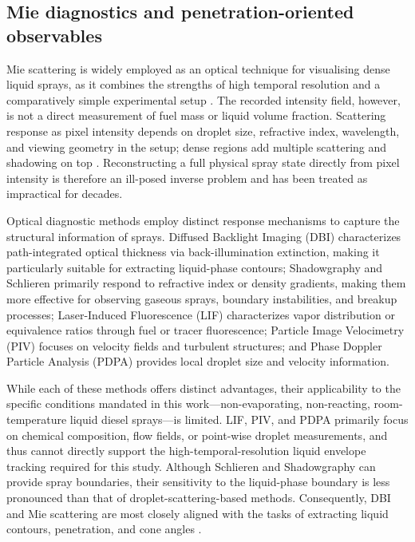 \documentclass[english, 12pt, a4paper, elec, utf8, a-2b, online]{aaltothesis}
\begin{document}
\subsection{Mie diagnostics and penetration-oriented observables}

Mie scattering is widely employed as an optical technique for visualising dense liquid sprays, 
as it combines the strengths of high temporal resolution and a comparatively simple experimental setup \cite{Linne2013SprayImaging}. 
The recorded intensity field, however, is not a direct measurement of fuel mass or liquid volume fraction. 
Scattering response as pixel intensity depends on droplet size, refractive index, wavelength, and viewing geometry in the setup; 
dense regions add multiple scattering and shadowing on top \cite{BohrenHuffman2004,Linne2013SprayImaging}. 
Reconstructing a full physical spray state directly from pixel intensity is therefore an ill-posed inverse problem 
and has been treated as impractical for decades.

Optical diagnostic methods employ distinct response mechanisms to capture the structural information of sprays. 
Diffused Backlight Imaging (DBI) characterizes path-integrated optical thickness via back-illumination extinction, 
making it particularly suitable for extracting liquid-phase contours; 
Shadowgraphy and Schlieren primarily respond to refractive index or density gradients, 
making them more effective for observing gaseous sprays, boundary instabilities, and breakup processes; 
Laser-Induced Fluorescence (LIF) characterizes vapor distribution or equivalence ratios through fuel or tracer fluorescence; 
Particle Image Velocimetry (PIV) focuses on velocity fields and turbulent structures; 
and Phase Doppler Particle Analysis (PDPA) provides local droplet size and velocity information.

While each of these methods offers distinct advantages, 
their applicability to the specific conditions mandated in this work---non-evaporating, non-reacting, room-temperature liquid diesel sprays---is limited. 
LIF, PIV, and PDPA primarily focus on chemical composition, flow fields, or point-wise droplet measurements, 
and thus cannot directly support the high-temporal-resolution liquid envelope tracking required for this study. 
Although Schlieren and Shadowgraphy can provide spray boundaries, 
their sensitivity to the liquid-phase boundary is less pronounced than that of droplet-scattering-based methods. 
Consequently, DBI and Mie scattering are most closely aligned with the tasks of extracting liquid contours, penetration, and cone angles \cite{Linne2013SprayImaging}.
\end{document}
